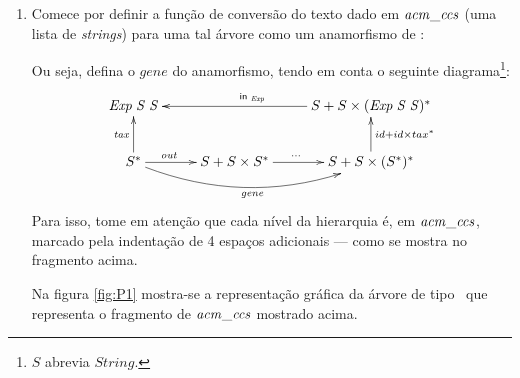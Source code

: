 \documentclass[a4paper]{article}
\newcommand{\Conid}[1]{\mathit{#1}}
\newcommand{\Varid}[1]{\mathit{#1}}
\def\resethooks{%
  \global\let\SaveRestoreHook\empty
  \global\let\ColumnHook\empty}
\let\hspre\empty
\let\hspost\empty
\begin{document}
\begin{enumerate}
\item Comece por definir a função de conversão do texto dado em \ensuremath{\Varid{acm\char95 ccs}}
(uma lista de \emph{strings}) para uma tal árvore como um anamorfismo de \Exp:
%
\resethooks
Ou seja, defina o \ensuremath{\Varid{gene}} do anamorfismo, 
tendo em conta o seguinte diagrama\footnote{\ensuremath{\Conid{S}} abrevia \ensuremath{\Conid{String}}.}:
\begin{eqnarray*}
\xymatrix{
  \ensuremath{\Conid{Exp}\;\Conid{S}\;\Conid{S}} & & S + S \times (\ensuremath{\Conid{Exp}\;\Conid{S}\;\Conid{S}})^*\ar[ll]_{\ensuremath{\mathsf{in}_{\tiny\ \textit{Exp}}}} \\
  S^*\ar@/_1.5pc/[rr]_{\ensuremath{\Varid{gene}}}\ar[r]^(0.35){\ensuremath{\Varid{out}}}\ar[u]^{\ensuremath{\Varid{tax}}} & S + S \times S^*\ar[r]^(0.45){\cdots} & S + S \times (S^*)^*\ar[u]_{id + id \times tax^*}
}
\end{eqnarray*}
Para isso, tome em atenção que cada nível da hierarquia é, em \ensuremath{\Varid{acm\char95 ccs}},
marcado pela indentação de 4 espaços adicionais --- como se mostra no fragmento acima.

Na figura \ref{fig:P1} mostra-se a representação gráfica da árvore de tipo \Exp\ que representa o fragmento de \ensuremath{\Varid{acm\char95 ccs}} mostrado acima.


\end{enumerate}
\end{document}
